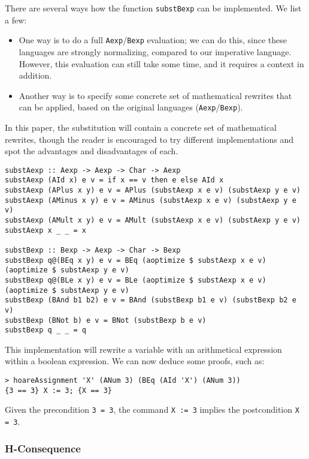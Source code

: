 \documentclass{article}
\begin{document}
There are several ways how the function \texttt{substBexp} can be implemented. We list a few:

\begin{itemize}
\item One way is to do a full \texttt{Aexp}/\texttt{Bexp} evaluation; we can do this, since these languages are strongly normalizing, compared to our imperative language. However, this evaluation can still take some time, and it requires a context in addition.
\item Another way is to specify some concrete set of mathematical rewrites that can be applied, based on the original languages (\texttt{Aexp}/\texttt{Bexp}).
\end{itemize}

In this paper, the substitution will contain a concrete set of mathematical rewrites, though the reader is encouraged to try different implementations and spot the advantages and disadvantages of each.

\begin{lstlisting}
substAexp :: Aexp -> Aexp -> Char -> Aexp
substAexp (AId x) e v = if x == v then e else AId x
substAexp (APlus x y) e v = APlus (substAexp x e v) (substAexp y e v)
substAexp (AMinus x y) e v = AMinus (substAexp x e v) (substAexp y e v)
substAexp (AMult x y) e v = AMult (substAexp x e v) (substAexp y e v)
substAexp x _ _ = x

substBexp :: Bexp -> Aexp -> Char -> Bexp
substBexp q@(BEq x y) e v = BEq (aoptimize $ substAexp x e v) (aoptimize $ substAexp y e v)
substBexp q@(BLe x y) e v = BLe (aoptimize $ substAexp x e v) (aoptimize $ substAexp y e v)
substBexp (BAnd b1 b2) e v = BAnd (substBexp b1 e v) (substBexp b2 e v)
substBexp (BNot b) e v = BNot (substBexp b e v)
substBexp q _ _ = q
\end{lstlisting}

This implementation will rewrite a variable with an arithmetical expression within a boolean expression. We can now deduce some proofs, such as:

\begin{lstlisting}
> hoareAssignment 'X' (ANum 3) (BEq (AId 'X') (ANum 3))
{3 == 3} X := 3; {X == 3}
\end{lstlisting}

Given the precondition \texttt{3 = 3}, the command \texttt{X := 3} implies the postcondition \texttt{X = 3}.

\subsubsection{H-Consequence}
\end{document}
